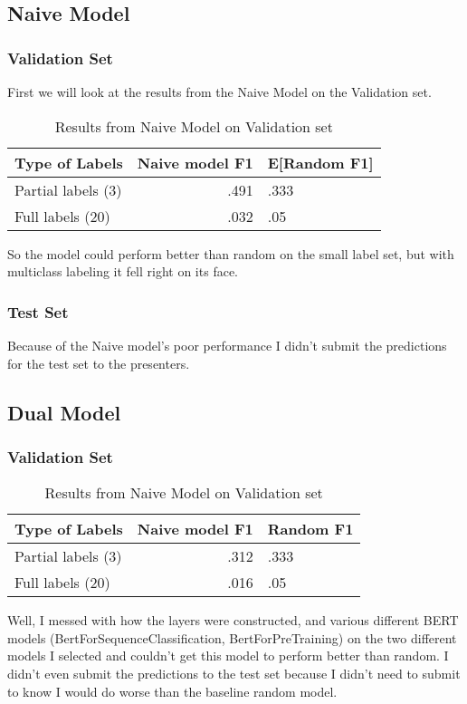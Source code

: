 \documentclass[11pt,a4paper]{article}
\begin{document}
\subsection{Naive Model}
\subsubsection{Validation Set}

First we will look at the results from the Naive Model on the Validation set.

\begin{table}[h]
\begin{tabular}{lrl}
\hline \textbf{Type of Labels} & \textbf{Naive model F1} & \textbf{E[Random F1]} \\ \hline
Partial labels (3) & .491 & .333 \\
Full labels (20) & .032 & .05 \\
\hline
\end{tabular}
\caption{\label{Naive Model Results} Results from Naive Model on Validation set}
\end{table}

So the model could perform better than random on the small label set, but with multiclass labeling it fell right on 
its face. 

\subsubsection{Test Set}
Because of the Naive model's poor performance I didn't submit the predictions for the test set to the presenters.

\subsection{Dual Model}
\subsubsection{Validation Set}
\begin{table}[h]
\begin{tabular}{lrl}
\hline \textbf{Type of Labels} & \textbf{Naive model F1} & \textbf{Random F1} \\ \hline
Partial labels (3) & .312 & .333 \\
Full labels (20) & .016 & .05 \\
\hline
\end{tabular}
\caption{\label{Naive Model Results} Results from Naive Model on Validation set}
\end{table}
Well, I messed with how the layers were constructed, and various different BERT models (BertForSequenceClassification, 
BertForPreTraining) on the two different models I selected and couldn't get this model to perform better than random.
I didn't even submit the predictions to the test set because I didn't need to submit to know I would do worse than
the baseline random model. \\
\end{document}
